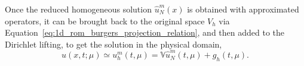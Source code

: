 \documentclass[../../thesis.tex]{subfiles}
\newcommand{\rbV}{\ensuremath{\mathbb{V}}}
\begin{document}

Once the reduced homogeneous solution $\hat{u}^{m}_N(x)$ is obtained 
with approximated operators, it can be brought back to the original space $V_h$ 
via Equation~\eqref{eq:1d_rom_burgers_projection_relation}, 
and then added to the Dirichlet lifting, 
to get the solution in the physical domain,
\begin{equation}
    u(x, t; \mu) \simeq u_h^{m}(t, \mu) = \rbV \hat{u}^{m}_N(t, \mu) + g_h(t,\mu).
\end{equation}
\end{document}
